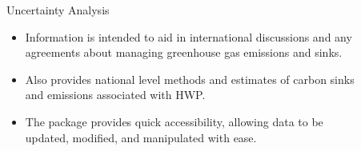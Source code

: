 \documentclass[final]{beamer}\usepackage[]{graphicx}\usepackage[]{color}
\newlength{\sepwid}
\newlength{\onecolwid}
\newlength{\twocolwid}
\begin{document}
\begin{frame}[t]
\begin{columns}[t]
\begin{column}{\onecolwid}
\end{column} %

\begin{column}{\sepwid}\end{column} %

\begin{column}{\twocolwid} %

\begin{columns}[t,totalwidth=\twocolwid] %

\begin{column}{\onecolwid}\vspace{-.6in} %



\begin{block}{Uncertainty Analysis}
\begin{itemize}
\item Information is intended to aid in international discussions and any agreements about managing greenhouse gas emissions and sinks.
\item Also provides national level methods and estimates of carbon sinks and emissions associated with HWP.
\item The package provides quick accessibility, allowing data to be updated, modified, and manipulated with ease.
\end{itemize}
\end{block}




\end{column} %

\begin{column}{\onecolwid}\vspace{-.6in} %


\end{column}
\end{columns}
\end{column}
\end{columns}
\end{frame}
\end{document}
